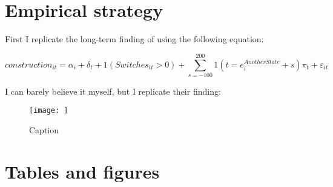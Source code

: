 \documentclass{article}
\begin{document}

\section{Empirical strategy}

First I replicate the long-term finding of \cite{schoenholzer2022} using the following equation:

\begin{equation}
    construction_{it} = \alpha_i + \delta_t + 1(Switches_{it} > 0) + 
    \sum_{s = -100}^{200} 1(t = e^{AnotherState}_i + s)\pi_t + \varepsilon_{it}
\end{equation}

I can barely believe it myself, but I replicate their finding:

\begin{figure}
    \centering
    \texttt{[image: ]}
    \caption{Caption}
    \label{fig:enter-label}
\end{figure}


\newpage
\onehalfspacing



\newpage
\section*{Tables and figures}
\end{document}
